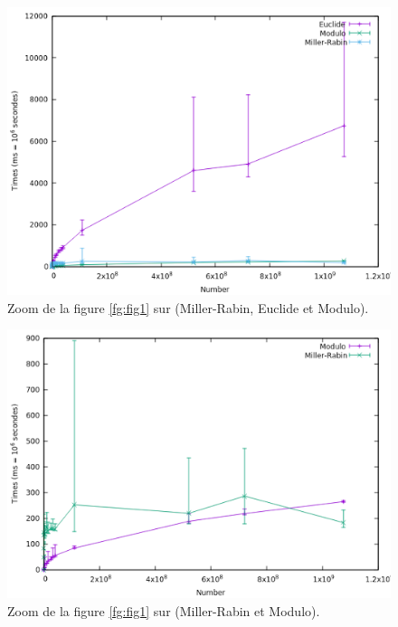 \begin{figure}[!ht]	
		\begin{center}\includegraphics[scale=0.5]{Zoom2.png}\end{center}
		\caption{Zoom de la figure \ref{fg:fig1} sur (Miller-Rabin, Euclide et Modulo).}
		\label{fg:fig3}
\end{figure}
\begin{figure}[!ht]	
		\begin{center}\includegraphics[scale=0.5]{Zoom3.png}\end{center}
		\caption{Zoom de la figure \ref{fg:fig1} sur (Miller-Rabin et Modulo).}
		\label{fg:fig4}
\end{figure}
	
